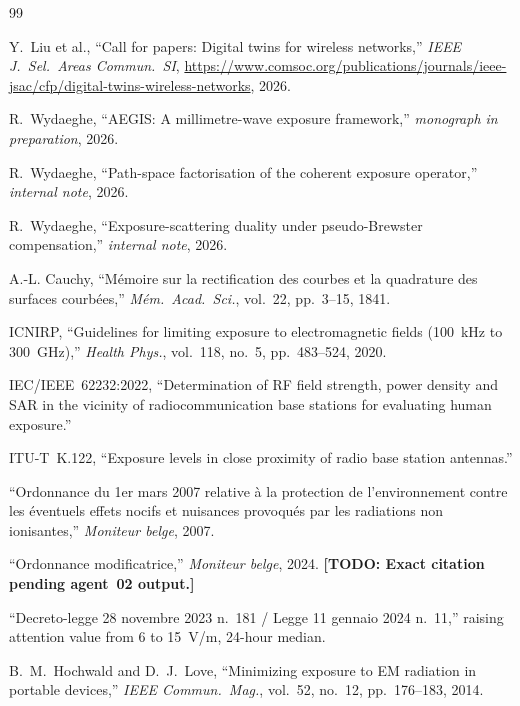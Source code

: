 \documentclass[journal,twocolumn,10pt]{IEEEtran}
\theoremstyle{definition}
\newcommand{\TODO}[1]{\textcolor{red!80!black}{\textbf{[TODO: #1]}}}
\begin{document}
\begin{thebibliography}{99}

Y.~Liu et al., ``Call for papers: Digital twins for wireless
networks,'' \emph{IEEE J.\ Sel.\ Areas Commun.\ SI},
\url{https://www.comsoc.org/publications/journals/ieee-jsac/cfp/digital-twins-wireless-networks},
2026.

R.~Wydaeghe, ``AEGIS: A millimetre-wave exposure framework,''
\emph{monograph in preparation}, 2026.

R.~Wydaeghe, ``Path-space factorisation of the coherent
exposure operator,'' \emph{internal note}, 2026.

R.~Wydaeghe, ``Exposure-scattering duality under pseudo-Brewster
compensation,'' \emph{internal note}, 2026.

A.-L. Cauchy, ``M\'emoire sur la rectification des courbes et la
quadrature des surfaces courb\'ees,'' \emph{M\'em.\ Acad.\ Sci.},
vol.~22, pp.~3--15, 1841.

ICNIRP, ``Guidelines for limiting exposure to electromagnetic
fields (100~kHz to 300~GHz),'' \emph{Health Phys.}, vol.~118,
no.~5, pp.~483--524, 2020.

IEC/IEEE~62232:2022, ``Determination of RF field strength, power
density and SAR in the vicinity of radiocommunication base
stations for evaluating human exposure.''

ITU-T~K.122, ``Exposure levels in close proximity of radio base
station antennas.''

``Ordonnance du 1er mars 2007 relative \`a la protection de
l'environnement contre les \'eventuels effets nocifs et nuisances
provoqu\'es par les radiations non ionisantes,'' \emph{Moniteur
belge}, 2007.

``Ordonnance modificatrice,'' \emph{Moniteur belge}, 2024.
\TODO{Exact citation pending agent~02 output.}

``Decreto-legge 28 novembre 2023 n.~181 / Legge 11 gennaio 2024
n.~11,'' raising attention value from 6 to 15~V/m, 24-hour median.

B.~M.~Hochwald and D.~J.~Love, ``Minimizing exposure to EM
radiation in portable devices,'' \emph{IEEE Commun.\ Mag.},
vol.~52, no.~12, pp.~176--183, 2014.


\end{thebibliography}
\end{document}

